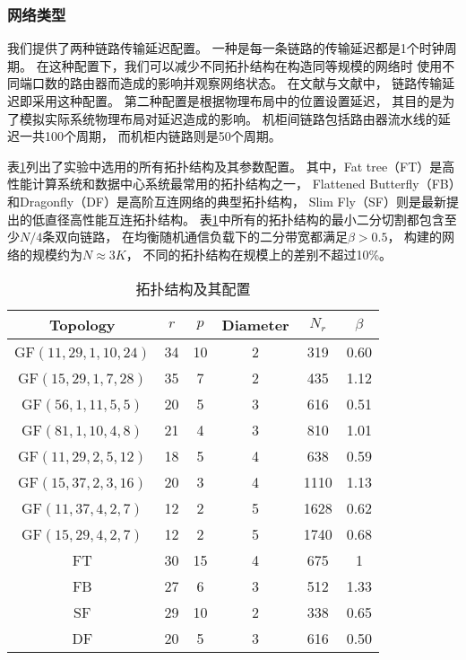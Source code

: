\subsubsection{网络类型}
我们提供了两种链路传输延迟配置。
一种是每一条链路的传输延迟都是1个时钟周期。
在这种配置下，我们可以减少不同拓扑结构在构造同等规模的网络时
使用不同端口数的路由器而造成的影响并观察网络状态。
在文献与文献中，
链路传输延迟即采用这种配置。
第二种配置是根据物理布局中的位置设置延迟，
其目的是为了模拟实际系统物理布局对延迟造成的影响。
机柜间链路包括路由器流水线的延迟一共100个周期，
而机柜内链路则是50个周期。

表\ref{chap3table6}列出了实验中选用的所有拓扑结构及其参数配置。
其中，Fat tree（FT）是高性能计算系统和数据中心系统最常用的拓扑结构之一，
Flattened Butterfly（FB）和Dragonfly（DF）是高阶互连网络的典型拓扑结构，
Slim Fly（SF）则是最新提出的低直径高性能互连拓扑结构。
表\ref{chap3table6}中所有的拓扑结构的最小二分切割都包含至少$N/4$条双向链路，
在均衡随机通信负载下的二分带宽都满足$\beta>0.5$，
构建的网络的规模约为$N\approx 3K$，
不同的拓扑结构在规模上的差别不超过10\%。

\begin{table}[t]
\caption{拓扑结构及其配置}
\centering
\begin{tabular}{cccccc}
  \toprule
  Topology	& $r$ &$p$ & Diameter & $N_r$ 	& $\beta$ \\
  \midrule
  GF$(11,29,1,10,24)$ &34 &10 &2	&319 		&0.60	\\
  GF$(15,29,1,7,28)$ &35 &7 &2	&435 		&1.12 \\
  GF$(56,1,11,5,5)$ &20 &5 &3	&616 		&0.51 \\
  GF$(81,1,10,4,8)$ &21 &4 &3	&810 	&1.01 \\
  GF$(11,29,2,5,12)$ &18 &5 &4	&638 		&0.59 \\
  GF$(15,37,2,3,16)$ &20 &3 &4	&1110 		&1.13 \\
  GF$(11,37,4,2,7)$ &12 &2 &5	&1628 		&0.62 \\
  GF$(15,29,4,2,7)$ &12 &2 &5	&1740 		&0.68 \\
  FT &30 &15 &4	&675		&1	\\
  FB &27 &6	  &3 &512		&1.33 \\
  SF &29 &10 &2	&338		&0.65 \\
  DF &20 &5	&3 &616		&0.50 \\
  \bottomrule
\end{tabular}
  \label{chap3table6}
\end{table}

